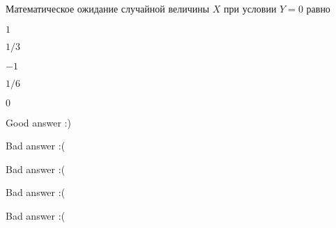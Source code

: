 
\begin{question}
Математическое ожидание случайной величины \(X\) при условии \(Y=0\)
равно
\begin{answerlist}
  \item \(1\)
  \item \(1/3\)
  \item \(-1\)
  \item \(1/6\)
  \item \(0\)
\end{answerlist}
\end{question}

\begin{solution}
\begin{answerlist}
  \item Good answer :)
  \item Bad answer :(
  \item Bad answer :(
  \item Bad answer :(
  \item Bad answer :(
\end{answerlist}
\end{solution}

